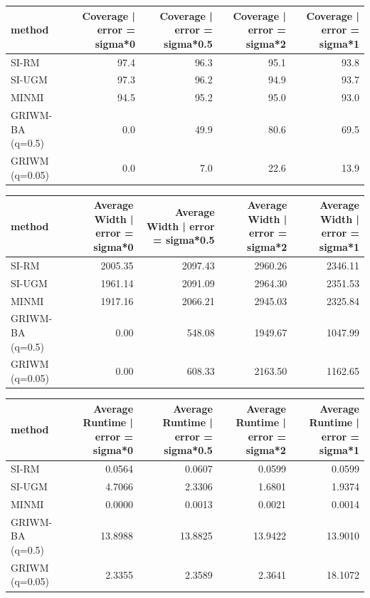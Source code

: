 \documentclass[
]{article}
\begin{document}
\begin{tabular}{l|r|r|r|r}
\hline
method & Coverage | error = sigma*0 & Coverage | error = sigma*0.5 & Coverage | error = sigma*2 & Coverage | error = sigma*1\\
\hline
SI-RM & 97.4 & 96.3 & 95.1 & 93.8\\
\hline
SI-UGM & 97.3 & 96.2 & 94.9 & 93.7\\
\hline
MINMI & 94.5 & 95.2 & 95.0 & 93.0\\
\hline
GRIWM-BA (q=0.5) & 0.0 & 49.9 & 80.6 & 69.5\\
\hline
GRIWM (q=0.05) & 0.0 & 7.0 & 22.6 & 13.9\\
\hline
\end{tabular}

\begin{tabular}{l|r|r|r|r}
\hline
method & Average Width | error = sigma*0 & Average Width | error = sigma*0.5 & Average Width | error = sigma*2 & Average Width | error = sigma*1\\
\hline
SI-RM & 2005.35 & 2097.43 & 2960.26 & 2346.11\\
\hline
SI-UGM & 1961.14 & 2091.09 & 2964.30 & 2351.53\\
\hline
MINMI & 1917.16 & 2066.21 & 2945.03 & 2325.84\\
\hline
GRIWM-BA (q=0.5) & 0.00 & 548.08 & 1949.67 & 1047.99\\
\hline
GRIWM (q=0.05) & 0.00 & 608.33 & 2163.50 & 1162.65\\
\hline
\end{tabular}

\begin{tabular}{l|r|r|r|r}
\hline
method & Average Runtime | error = sigma*0 & Average Runtime | error = sigma*0.5 & Average Runtime | error = sigma*2 & Average Runtime | error = sigma*1\\
\hline
SI-RM & 0.0564 & 0.0607 & 0.0599 & 0.0599\\
\hline
SI-UGM & 4.7066 & 2.3306 & 1.6801 & 1.9374\\
\hline
MINMI & 0.0000 & 0.0013 & 0.0021 & 0.0014\\
\hline
GRIWM-BA (q=0.5) & 13.8988 & 13.8825 & 13.9422 & 13.9010\\
\hline
GRIWM (q=0.05) & 2.3355 & 2.3589 & 2.3641 & 18.1072\\
\hline
\end{tabular}
\end{document}
